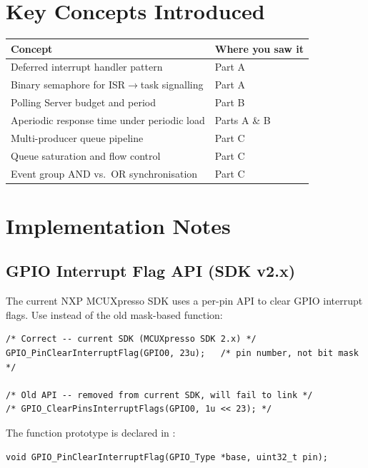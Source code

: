 \documentclass[11pt, a4paper]{article}
\begin{document}
\section{Key Concepts Introduced}

\renewcommand{\arraystretch}{1.3}
\begin{tabular}{@{} p{7cm} p{6cm} @{}}
  \toprule
  \textbf{Concept} & \textbf{Where you saw it} \\
  \midrule
  Deferred interrupt handler pattern         & Part A \\
  Binary semaphore for ISR$\to$task signalling & Part A \\
  Polling Server budget and period           & Part B \\
  Aperiodic response time under periodic load & Parts A \& B \\
  Multi-producer queue pipeline              & Part C \\
  Queue saturation and flow control          & Part C \\
  Event group AND vs.\ OR synchronisation    & Part C \\
  \bottomrule
\end{tabular}
\renewcommand{\arraystretch}{1}

\section{Implementation Notes}

\subsection{GPIO Interrupt Flag API (SDK v2.x)}

The current NXP MCUXpresso SDK uses a per-pin API to clear GPIO interrupt flags.
Use  instead of the old mask-based function:

\begin{lstlisting}[style=cstyle]
/* Correct -- current SDK (MCUXpresso SDK 2.x) */
GPIO_PinClearInterruptFlag(GPIO0, 23u);   /* pin number, not bit mask */

/* Old API -- removed from current SDK, will fail to link */
/* GPIO_ClearPinsInterruptFlags(GPIO0, 1u << 23); */
\end{lstlisting}

The function prototype is declared in :
\begin{lstlisting}[style=cstyle]
void GPIO_PinClearInterruptFlag(GPIO_Type *base, uint32_t pin);
\end{lstlisting}
\end{document}
